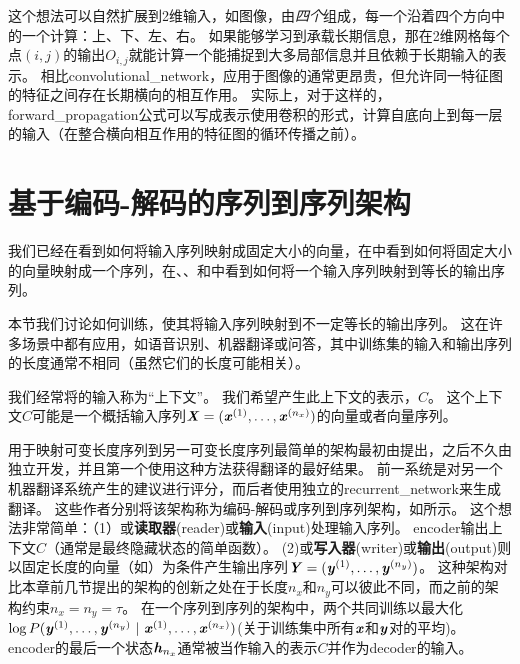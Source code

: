 这个想法可以自然扩展到2维输入，如图像，由\emph{四个}组成，每一个沿着四个方向中的一个计算：上、下、左、右。
如果能够学习到承载长期信息，那在2维网格每个点$(i, j)$的输出$O_{i,j}$就能计算一个能捕捉到大多局部信息并且依赖于长期输入的表示。
相比\gls{convolutional_network}，应用于图像的通常更昂贵，但允许同一特征图的特征之间存在长期横向的相互作用\citep{Visin-et-al-arxiv2015-renet,kalchbrenner2015grid}。
实际上，对于这样的，\gls{forward_propagation}公式可以写成表示使用卷积的形式，计算自底向上到每一层的输入（在整合横向相互作用的特征图的循环传播之前）。


\section{基于编码-解码的序列到序列架构}
\label{sec:encoder_decoder_sequence_to_sequence_architectures}
我们已经在看到如何将输入序列映射成固定大小的向量，在中看到如何将固定大小的向量映射成一个序列，在、、和中看到如何将一个输入序列映射到等长的输出序列。

本节我们讨论如何训练，使其将输入序列映射到不一定等长的输出序列。
这在许多场景中都有应用，如语音识别、机器翻译或问答，其中训练集的输入和输出序列的长度通常不相同（虽然它们的长度可能相关）。

我们经常将的输入称为``上下文''。
我们希望产生此上下文的表示，$C$。
这个上下文$C$可能是一个概括输入序列$\boldsymbol{\mathit{X}}=(\boldsymbol{\mathit{x}}^{(1)},\dots,\boldsymbol{\mathit{x}}^{(n_x)})$的向量或者向量序列。

用于映射可变长度序列到另一可变长度序列最简单的架构最初由\cite{cho-al-emnlp14}提出，之后不久由\cite{Sutskever-et-al-NIPS2014}独立开发，并且第一个使用这种方法获得翻译的最好结果。
前一系统是对另一个机器翻译系统产生的建议进行评分，而后者使用独立的\gls{recurrent_network}来生成翻译。
这些作者分别将该架构称为编码-解码或序列到序列架构，如所示。
这个想法非常简单：（1）或\textbf{读取器}(reader)或\textbf{输入}(input)处理输入序列。
\gls{encoder}输出上下文$C$（通常是最终隐藏状态的简单函数）。
(2)或\textbf{写入器}(writer)或\textbf{输出}(output)则以固定长度的向量（如）为条件产生输出序列$\boldsymbol{\mathit{Y}}=(\boldsymbol{\mathit{y}}^{(1)}, \dots, \boldsymbol{\mathit{y}}^{(n_y)})$。
这种架构对比本章前几节提出的架构的创新之处在于长度$n_x$和$n_y$可以彼此不同，而之前的架构约束$n_x = n_y = \tau$。
在一个序列到序列的架构中，两个共同训练以最大化$\log P( \boldsymbol{\mathit{y}}^{(1)}, \dots, \boldsymbol{\mathit{y}}^{(n_y)} ~|~ \boldsymbol{\mathit{x}}^{(1)},\dots,\boldsymbol{\mathit{x}}^{(n_x)} )$(关于训练集中所有$\boldsymbol{\mathit{x}}$和$\boldsymbol{\mathit{y}}$对的平均)。
\gls{encoder}的最后一个状态$\boldsymbol{\mathit{h}}_{n_x}$通常被当作输入的表示$C$并作为\gls{decoder}的输入。

